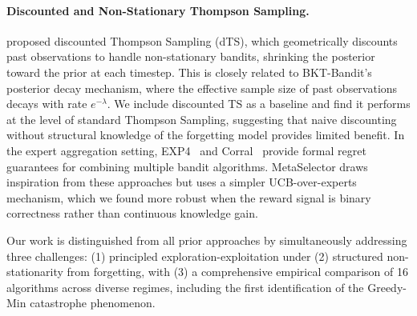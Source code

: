 \paragraph{Discounted and Non-Stationary Thompson Sampling.}
\citet{raj2017taming} proposed discounted Thompson Sampling (dTS), which geometrically discounts past observations to handle non-stationary bandits, shrinking the posterior toward the prior at each timestep.
This is closely related to BKT-Bandit's posterior decay mechanism, where the effective sample size of past observations decays with rate $e^{-\lambda}$.
We include discounted TS as a baseline and find it performs at the level of standard Thompson Sampling, suggesting that naive discounting without structural knowledge of the forgetting model provides limited benefit.
In the expert aggregation setting, EXP4~\citep{lattimore2020bandit} and Corral~\citep{agarwal2017corralling} provide formal regret guarantees for combining multiple bandit algorithms.
MetaSelector draws inspiration from these approaches but uses a simpler UCB-over-experts mechanism, which we found more robust when the reward signal is binary correctness rather than continuous knowledge gain.

Our work is distinguished from all prior approaches by simultaneously addressing three challenges: (1) principled exploration-exploitation under (2) structured non-stationarity from forgetting, with (3) a comprehensive empirical comparison of 16 algorithms across diverse regimes, including the first identification of the Greedy-Min catastrophe phenomenon.
